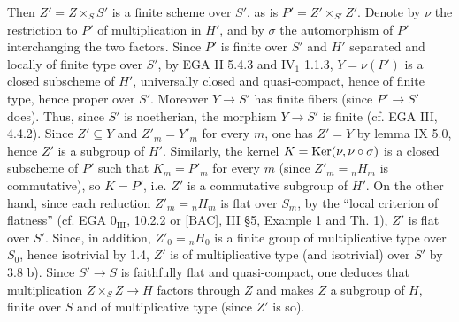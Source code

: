 Then $Z'=Z\times_S S'$ is a finite scheme over $S'$, as is $P'=Z'\times_{S'}Z'$. Denote by $\nu$ the restriction to $P'$ of multiplication in $H'$, and by $\sigma$ the automorphism of $P'$ interchanging the two factors. Since $P'$ is finite over $S'$ and $H'$ separated and locally of finite type over $S'$, by EGA II 5.4.3 and IV$_1$ 1.1.3, $Y=\nu(P')$ is a closed subscheme of $H'$, universally closed and quasi-compact, hence of finite type, hence proper over $S'$. Moreover $Y\to S'$ has finite fibers (since $P'\to S'$ does). Thus, since $S'$ is noetherian, the morphism $Y\to S'$ is finite (cf. EGA III, 4.4.2). Since $Z'\subseteq Y$ and $Z'_m=Y'_m$ for every $m$, one has $Z'=Y$ by lemma IX 5.0, hence $Z'$ is a subgroup of $H'$. Similarly, the kernel $K=\operatorname{Ker}(\nu,\nu\circ\sigma)$ is a closed subscheme of $P'$ such that $K_m=P'_m$ for every $m$ (since $Z'_m={}_nH_m$ is commutative), so $K=P'$, i.e. $Z'$ is a commutative subgroup of $H'$.
On the other hand, since each reduction $Z'_m={}_nH_m$ is flat over $S_m$, by the ``local criterion of flatness'' (cf. EGA $0_{\mathrm{III}}$, 10.2.2 or [BAC], III \S5, Example 1 and Th. 1), $Z'$ is flat over $S'$. Since, in addition, $Z'_0={}_nH_0$ is a finite group of multiplicative type over $S_0$, hence isotrivial by 1.4, $Z'$ is of multiplicative type (and isotrivial) over $S'$ by 3.8 b). Since $S'\to S$ is faithfully flat and quasi-compact, one deduces that multiplication $Z\times_S Z\to H$ factors through $Z$ and makes $Z$ a subgroup of $H$, finite over $S$ and of multiplicative type (since $Z'$ is so).

